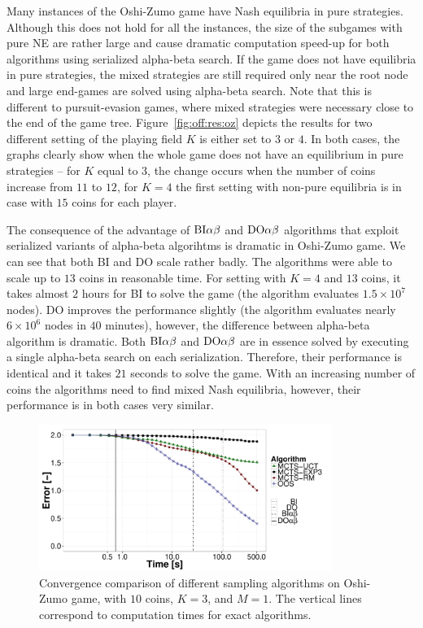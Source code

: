 Many instances of the Oshi-Zumo game have Nash equilibria in pure strategies. 
Although this does not hold for all the instances, the size of the subgames with pure NE are rather large and cause dramatic computation speed-up for both algorithms using serialized alpha-beta search.
If the game does not have equilibria in pure strategies, the mixed strategies are still required only near the root node and large end-games are solved using alpha-beta search.
Note that this is different to pursuit-evasion games, where mixed strategies were necessary close to the end of the game tree.
Figure~\ref{fig:off:res:oz} depicts the results for two different setting of the playing field $K$ is either set to $3$ or $4$.
In both cases, the graphs clearly show when the whole game does not have an equilibrium in pure strategies -- for $K$ equal to $3$, the change occurs when the number of coins increase from $11$ to $12$, for $K=4$ the first setting with non-pure equilibria is in case with $15$ coins for each player.

The consequence of the advantage of $\textrm{BI}\alpha\beta$ and $\textrm{DO}\alpha\beta$ algorithms that exploit serialized variants of alpha-beta algorihtms is dramatic in Oshi-Zumo game. 
We can see that both \textsc{BI} and \textsc{DO} scale rather badly.
The algorithms were able to scale up to $13$ coins in reasonable time. 
For setting with $K=4$ and $13$ coins, it takes almost $2$ hours for \textsc{BI} to solve the game (the algorithm evaluates $1.5\times10^7$ nodes).
\textsc{DO} improves the performance slightly (the algorithm evaluates nearly $6\times10^6$ nodes in $40$ minutes), however, the difference between alpha-beta algorithm is dramatic. 
Both $\textrm{BI}\alpha\beta$ and $\textrm{DO}\alpha\beta$ are in essence solved by executing a single alpha-beta search on each serialization.
Therefore, their performance is identical and it takes $21$ seconds to solve the game.
With an increasing number of coins the algorithms need to find mixed Nash equilibria, however, their performance is in both cases very similar.

\begin{figure}
\centering
\includegraphics[width=0.85\textwidth]{figures/convergence-oz.pdf}
\caption{Convergence comparison of different sampling algorithms on Oshi-Zumo game, with $10$ coins, $K=3$, and $M=1$. The vertical lines correspond to computation times for exact algorithms.} \label{fig:off:conv:oz}
\end{figure}

